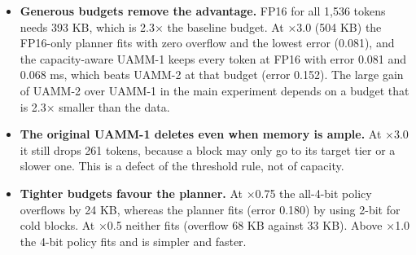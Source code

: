 \documentclass[12pt,a4paper]{report}
\begin{document}
\begin{itemize}
\item \textbf{Generous budgets remove the advantage.} FP16 for all 1,536 tokens needs 393 KB, which is 2.3× the baseline budget. At ×3.0 (504 KB) the FP16-only planner fits with zero overflow and the lowest error (0.081), and the capacity-aware UAMM-1 keeps every token at FP16 with error 0.081 and 0.068 ms, which beats UAMM-2 at that budget (error 0.152). The large gain of UAMM-2 over UAMM-1 in the main experiment depends on a budget that is 2.3× smaller than the data.
\item \textbf{The original UAMM-1 deletes even when memory is ample.} At ×3.0 it still drops 261 tokens, because a block may only go to its target tier or a slower one. This is a defect of the threshold rule, not of capacity.
\item \textbf{Tighter budgets favour the planner.} At ×0.75 the all-4-bit policy overflows by 24 KB, whereas the planner fits (error 0.180) by using 2-bit for cold blocks. At ×0.5 neither fits (overflow 68 KB against 33 KB). Above ×1.0 the 4-bit policy fits and is simpler and faster.
\end{itemize}
\end{document}
